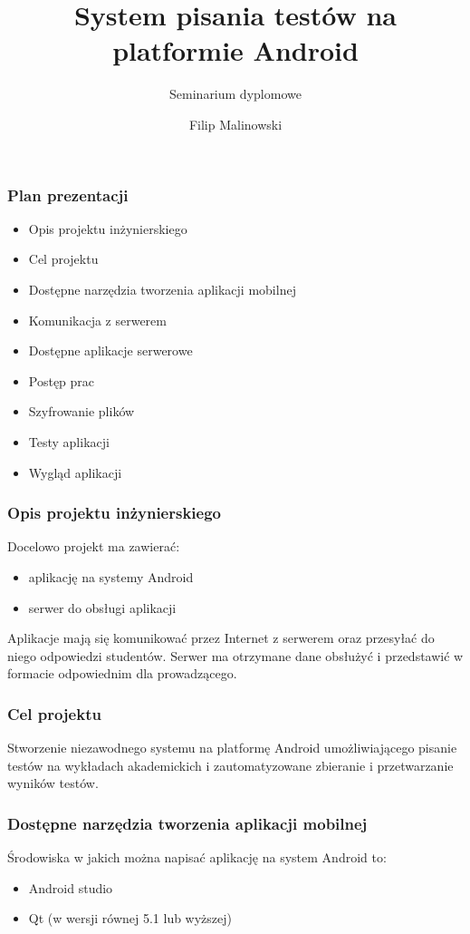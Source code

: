 \documentclass{beamer}
\title
{System pisania testów na platformie Android}
\subtitle{Seminarium dyplomowe}
\author{Filip Malinowski}
\begin{document}
  \begin{frame}
	\titlepage
  \end{frame}

  \begin{frame}
    \frametitle{Plan prezentacji}
    \begin{itemize}
    \item Opis projektu inżynierskiego
    \item Cel projektu
    \item Dostępne narzędzia tworzenia aplikacji mobilnej
    \item Komunikacja z serwerem
    \item Dostępne aplikacje serwerowe
    \item Postęp prac
    \item Szyfrowanie plików
    \item Testy aplikacji
    \item Wygląd aplikacji
    \end{itemize}
  \end{frame}

  \begin{frame}
    \frametitle{Opis projektu inżynierskiego}
    Docelowo projekt ma zawierać:
    \begin{itemize}
    \item aplikację na systemy Android
    \item serwer do obsługi aplikacji
    \end{itemize}
    Aplikacje mają się komunikować przez Internet z serwerem oraz przesyłać do
    niego odpowiedzi studentów. Serwer ma otrzymane dane obsłużyć i przedstawić
    w formacie odpowiednim dla prowadzącego.
  \end{frame}

  \begin{frame}
    \frametitle{Cel projektu}
    Stworzenie niezawodnego systemu na platformę Android umożliwiającego pisanie testów na wykładach akademickich i zautomatyzowane zbieranie i przetwarzanie wyników testów.
  \end{frame}

  \begin{frame}
    \frametitle{Dostępne narzędzia tworzenia aplikacji mobilnej}
    Środowiska w jakich można napisać aplikację na system Android to:
    \begin{itemize}
    \item Android studio
    \item Qt (w wersji równej 5.1 lub wyższej)
    \end{itemize}
  \end{frame}
\end{document}

